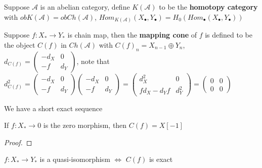 \documentclass[../main.tex]{subfiles}
\begin{document}
\begin{definition}
Suppose $\mathscr A$ is an abelian category, define $K(\mathscr A)$ to be the \textbf{homotopy category} with $obK(\mathscr A)=obCh(\mathscr A)$, $Hom_{K(\mathscr A)}(X_\bullet,Y_\bullet)=H_0(Hom_\bullet(X_\bullet,Y_\bullet))$
\end{definition}

\begin{definition}
Suppose $f:X_*\to Y_*$ is chain map, then the \textbf{mapping cone} of $f$ is defined to be the object $C(f)$ in $Ch(\mathscr A)$ with $C(f)_{n}=X_{n-1}\oplus Y_n$, $d_{C(f)}=\begin{pmatrix}
-d_X &0\\
-f&d_Y
\end{pmatrix}$, note that $d^2_{C(f)}=\begin{pmatrix}
-d_X &0\\
-f&d_Y
\end{pmatrix}\begin{pmatrix}
-d_X &0\\
-f&d_Y
\end{pmatrix}=\begin{pmatrix}
d^2_X &0\\
fd_X-d_Yf&d^2_Y
\end{pmatrix}=\begin{pmatrix}
0 &0\\
0&0
\end{pmatrix}$
\end{definition}

\begin{lemma}
We have a short exact sequence
\begin{center}
\end{center}
\end{lemma}

\begin{remark}
If $f:X_*\to0$ is the zero morphism, then $C(f)=X[-1]$
\end{remark}

\begin{proof}

\end{proof}

\begin{corollary}
$f:X_*\to Y_*$ is a quasi-isomorphism $\Leftrightarrow$ $C(f)$ is exact
\end{corollary}
\end{document}
